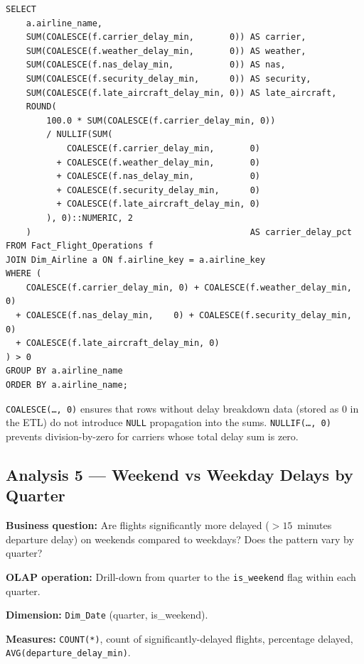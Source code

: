\documentclass[12pt,a4paper]{article}
\begin{document}
\begin{lstlisting}[style=sql]
SELECT
    a.airline_name,
    SUM(COALESCE(f.carrier_delay_min,       0)) AS carrier,
    SUM(COALESCE(f.weather_delay_min,       0)) AS weather,
    SUM(COALESCE(f.nas_delay_min,           0)) AS nas,
    SUM(COALESCE(f.security_delay_min,      0)) AS security,
    SUM(COALESCE(f.late_aircraft_delay_min, 0)) AS late_aircraft,
    ROUND(
        100.0 * SUM(COALESCE(f.carrier_delay_min, 0))
        / NULLIF(SUM(
            COALESCE(f.carrier_delay_min,       0)
          + COALESCE(f.weather_delay_min,       0)
          + COALESCE(f.nas_delay_min,           0)
          + COALESCE(f.security_delay_min,      0)
          + COALESCE(f.late_aircraft_delay_min, 0)
        ), 0)::NUMERIC, 2
    )                                           AS carrier_delay_pct
FROM Fact_Flight_Operations f
JOIN Dim_Airline a ON f.airline_key = a.airline_key
WHERE (
    COALESCE(f.carrier_delay_min, 0) + COALESCE(f.weather_delay_min, 0)
  + COALESCE(f.nas_delay_min,    0) + COALESCE(f.security_delay_min, 0)
  + COALESCE(f.late_aircraft_delay_min, 0)
) > 0
GROUP BY a.airline_name
ORDER BY a.airline_name;
\end{lstlisting}

\texttt{COALESCE(\ldots, 0)} ensures that rows without delay breakdown data
(stored as 0 in the ETL) do not introduce \texttt{NULL} propagation into the
sums. \texttt{NULLIF(\ldots, 0)} prevents division-by-zero for carriers whose
total delay sum is zero.

\subsection{Analysis 5 — Weekend vs Weekday Delays by Quarter}

\textbf{Business question:} Are flights significantly more delayed
($>15$~minutes departure delay) on weekends compared to weekdays? Does the
pattern vary by quarter?

\textbf{OLAP operation:} Drill-down from quarter to the
\texttt{is\_weekend} flag within each quarter.

\textbf{Dimension:} \texttt{Dim\_Date} (quarter, is\_weekend).

\textbf{Measures:} \texttt{COUNT(*)}, count of significantly-delayed
flights, percentage delayed, \texttt{AVG(departure\_delay\_min)}.
\end{document}
